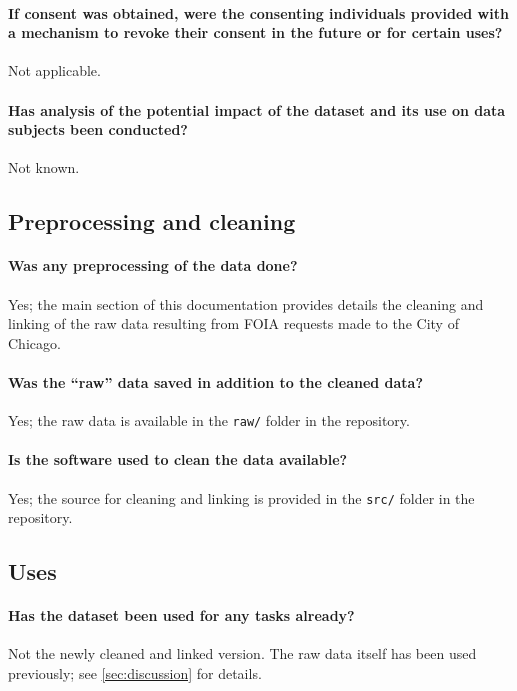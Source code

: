 \paragraph{If consent was obtained, were the consenting individuals provided with a mechanism to revoke their consent in the future or for certain uses?}
Not applicable.

\paragraph{Has analysis of the potential impact of the dataset and its use on data subjects been conducted?}
Not known.

\subsection{Preprocessing and cleaning}

\paragraph{Was any preprocessing of the data done?}
Yes; the main section of this documentation provides details the cleaning and linking of the raw
data resulting from FOIA requests made to the City of Chicago.

\paragraph{Was the ``raw'' data saved in addition to the cleaned data?}
Yes; the raw data is available in the \texttt{raw/} folder in the repository.

\paragraph{Is the software used to clean the data available?}
Yes; the source for cleaning and linking is provided in the \texttt{src/} folder in the repository.

\subsection{Uses}

\paragraph{Has the dataset been used for any tasks already?}
Not the newly cleaned and linked version.
The raw data itself has been used previously; see \cref{sec:discussion} for details.

